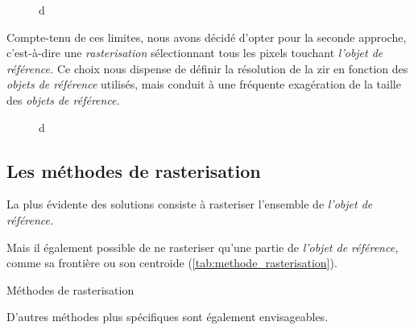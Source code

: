 \begin{figure}
  \centering
  
  \caption{d}
  \label{fig:rasterisation_sel_pixels}
\end{figure}

Compte-tenu de ces limites, nous avons décidé d'opter pour la seconde approche, c'est-à-dire une \emph{rasterisation} sélectionnant tous les pixels touchant \emph{l'objet de référence.} Ce choix nous dispense de définir la résolution de la \ac{zir} en fonction des \emph{objets de référence} utilisés, mais conduit à une fréquente exagération de la taille des \emph{objets de référence.}

\begin{figure}
  \centering
  
  \caption{d}
  \label{fig:rasterisation_cas_limite}
\end{figure}

\subsection{Les méthodes de rasterisation}



La plus évidente des solutions consiste à rasteriser l'ensemble de
\emph{l'objet de référence.}


Mais il également possible de ne rasteriser qu'une partie de
\emph{l'objet de référence,} comme sa frontière ou son centroide
(\autoref{tab:methode_rasterisation}).

\begin{table}
  \centering
  
  \caption{Méthodes de rasterisation}
  \label{tab:methode_rasterisation}
\end{table}


D'autres méthodes plus spécifiques sont également envisageables.

